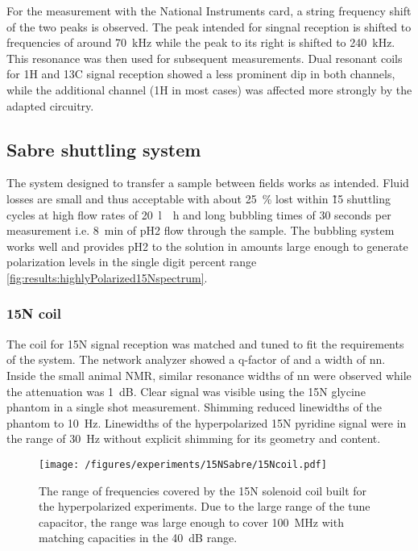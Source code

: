             For the measurement with the National Instruments card, a string frequency shift of the two peaks is observed. The peak intended for singnal reception is shifted to frequencies of around \SI{70}{\kilo\hertz} while the peak to its right is shifted to \SI{240}{\kilo\hertz}. This resonance was then used for subsequent measurements. Dual resonant coils for 1H and 13C signal reception showed a less prominent dip in both channels, while the additional channel (1H in most cases)  was affected more strongly by the adapted circuitry.
    \subsection{Sabre shuttling system}
        The system designed to transfer a sample between fields works as intended. Fluid losses are small and thus
        acceptable with about \SI{25}{\percent} lost within \~15 shuttling cycles at high flow rates of \SI{20}{\litre
        \per\hour} and long bubbling times of 30 seconds per measurement i.e. \SI{8}{\minute} of pH2 flow through the
        sample. The bubbling system works well and provides pH2 to the solution in amounts large enough to generate
        polarization levels in the single digit percent range \ref{fig:results:highlyPolarized15Nspectrum}.
        \subsubsection{15N coil}
            The coil for 15N signal reception was matched and tuned to fit the requirements of the system. The network analyzer showed a q-factor of  and a width of nn. Inside the small animal NMR, similar resonance widths of nn were observed while the attenuation was \SI{1}{\deci\bel}. Clear signal was visible using the 15N glycine phantom in a single shot measurement. Shimming reduced linewidths of the phantom to \SI{10}{\hertz}. Linewidths of the hyperpolarized 15N pyridine signal were in the range of \SI{30}{\hertz} without explicit shimming for its geometry and content.
                \begin{figure}
                    \texttt{[image: /figures/experiments/15NSabre/15Ncoil.pdf]}
                    \caption[15N coil network analysis]{The range of frequencies covered by the 15N solenoid coil built for the hyperpolarized experiments. Due to the large range of the tune capacitor, the range was large enough to cover \SI{100}{\mega\hertz} with matching capacities in the \SI{40}{\deci\bel} range.}
                    \label{fig:results:15N:networkAnalysisCoil}
                \end{figure}
